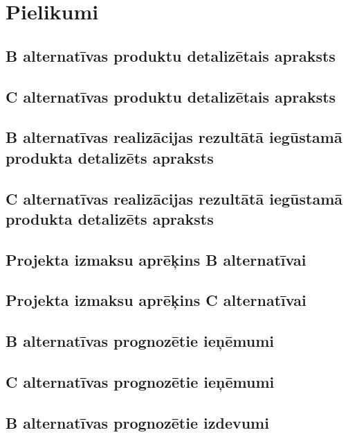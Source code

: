 \appendix
\chapter*{Pielikumi}
\renewcommand{\thesection}{\arabic{section}}
    
\section{B alternatīvas produktu detalizētais apraksts}
    \label{app:B_detalizetais_aprkasts}
    \clearpage
\section{C alternatīvas produktu detalizētais apraksts}
	\label{app:C_detalizetais_aprkasts}
    \clearpage
\section{B alternatīvas realizācijas rezultātā iegūstamā produkta detalizēts apraksts}
	\label{app:B_realizacija}
    \clearpage
\section{C alternatīvas realizācijas rezultātā iegūstamā produkta detalizēts apraksts}
	\label{app:C_realizacija}
    \clearpage
\section{Projekta izmaksu aprēķins B alternatīvai}
	\label{app:B_izmaksas}
    \clearpage
\section{Projekta izmaksu aprēķins C alternatīvai}
	\label{app:C_izmaksas}
    \clearpage
\section{B alternatīvas prognozētie ieņēmumi}
	\label{app:B_ienemumi}
    \clearpage
\section{C alternatīvas prognozētie ieņēmumi}
	\label{app:C_ienemumi}
    \clearpage
\section{B alternatīvas prognozētie izdevumi}
	\label{app:B_izdevumi}
    \clearpage
